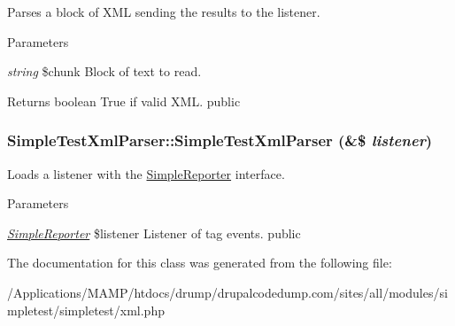 \label{class_simple_test_xml_parser_af5eff8c0132f452c47bca965d6ff37ed}
Parses a block of XML sending the results to the listener. 
\begin{DoxyParams}{Parameters}
\item[{\em string}]\$chunk Block of text to read. \end{DoxyParams}
\begin{DoxyReturn}{Returns}
boolean True if valid XML.  public 
\end{DoxyReturn}
\hypertarget{class_simple_test_xml_parser_a2d2e15390947baa26a5771971ca3917b}{
\subsubsection[{SimpleTestXmlParser}]{\setlength{\rightskip}{0pt plus 5cm}SimpleTestXmlParser::SimpleTestXmlParser (\&\$ {\em listener})}}
\label{class_simple_test_xml_parser_a2d2e15390947baa26a5771971ca3917b}
Loads a listener with the \hyperlink{class_simple_reporter}{SimpleReporter} interface. 
\begin{DoxyParams}{Parameters}
\item[{\em \hyperlink{class_simple_reporter}{SimpleReporter}}]\$listener Listener of tag events.  public \end{DoxyParams}


The documentation for this class was generated from the following file:\begin{DoxyCompactItemize}
\item 
/Applications/MAMP/htdocs/drump/drupalcodedump.com/sites/all/modules/simpletest/simpletest/xml.php\end{DoxyCompactItemize}
